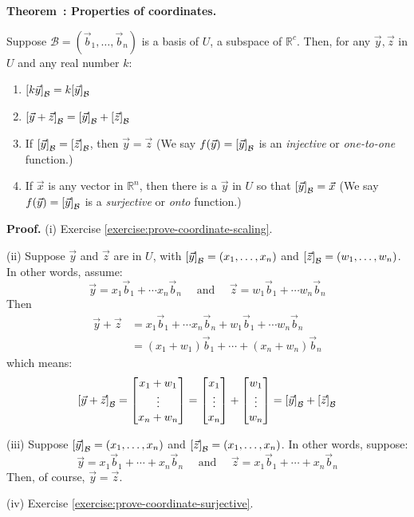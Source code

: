 \documentclass[11pt, letterpaper]{report}
\newenvironment{book}{}{}
\let\originalleft\left
\let\originalright\right
\renewcommand{\left}{\mathopen{}\mathclose\bgroup\originalleft}
\renewcommand{\right}{\aftergroup\egroup\originalright}
\newcounter{exercise}[section]
\newcounter{theorem}[chapter]
\newenvironment{theorem}[1][]{\refstepcounter{theorem}\begin{bbox}\par
    \noindent\textbf{Theorem~\thetheorem: #1}}{\end{bbox}}
\newlength\oldfboxsep%
\newlength\myminiwidth%
\newenvironment{bbox}{%
  \setlength\oldfboxsep\fboxsep
  \setlength{\fboxsep}{.1in}%
  \setlength\myminiwidth\linewidth%
  \addtolength\myminiwidth{-0.2in}%
  \vspace{0.1in}%
  \begin{lrbox}{\bboxbox}\begin{minipage}{\myminiwidth}%
    }{%
    \end{minipage}\end{lrbox}%
  \noindent\fbox{\usebox{\bboxbox}}\vspace{0.1in}\setlength\fboxsep\oldfboxsep%
}
\newcommand{\R}{\mathbb{R}}
\newcommand{\bbbvec}[3]{
  \begin{bmatrix} #1 \\ #2 \\ #3 \end{bmatrix}
}
\begin{document}
\begin{theorem}[Properties of coordinates.] 
\label{theorem:properties-of-coordinates}

Suppose $\mathcal{B} = ( \vec{b}_1, \ldots, \vec{b}_n )$ is a basis of $U$, a subspace of $\R^c$. Then, for any $\vec{y},\vec{z}$ in $U$ and any real number $k$:
\begin{enumerate}[label=(\roman*)]
\item $\left[ k\vec{y} \right]_{\mathcal{B}} = k \left[ \vec{y} \right]_{\mathcal{B}}$
\item $\left[ \vec{y} + \vec{z} \right]_{\mathcal{B}} =  \left[ \vec{y} \right]_{\mathcal{B}}+\left[ \vec{z} \right]_{\mathcal{B}}$
\item If $\left[ \vec{y} \right]_{\mathcal{B}} = \left[ \vec{z} \right]_{\mathcal{B}}$, then $\vec{y}=\vec{z}$ \quad (We say $f(\vec{y}) =\left[ \vec{y} \right]_{\mathcal{B}}$ is an \emph{injective} or \emph{one-to-one} function.)
\item If $\vec{x}$ is any vector in $\R^n$, then there is a $\vec{y}$ in $U$ so that $\left[ \vec{y} \right]_{\mathcal{B}}=\vec{x}$ \quad (We say $f(\vec{y}) =\left[ \vec{y} \right]_{\mathcal{B}}$ is a \emph{surjective} or \emph{onto} function.)
\end{enumerate}
\end{theorem}

\begin{book}
\textbf{Proof.} (i) Exercise \ref{exercise:prove-coordinate-scaling}.

(ii) Suppose $\vec{y}$ and $\vec{z}$ are in $U$, with $\left[ \vec{y} \right]_{\mathcal{B}}= (x_1,\ldots,x_n)$ and $\left[ \vec{z} \right]_{\mathcal{B}}= (w_1,\ldots,w_n)$. In other words, assume: \[\vec{y}=x_1\vec{b}_1 + \cdots x_n\vec{b}_n \quad \text{ and }\quad \vec{z}=w_1\vec{b}_1 + \cdots w_n\vec{b}_n\]
Then
\begin{align*}
\vec{y}+\vec{z} &= x_1\vec{b}_1 + \cdots x_n\vec{b}_n + w_1\vec{b}_1 + \cdots w_n\vec{b}_n \\
&=(x_1+w_1)\vec{b}_1 + \cdots + (x_n+w_n)\vec{b}_n
\end{align*}
which means: \[\left[ \vec{y}+\vec{z} \right]_{\mathcal{B}} = \bbbvec{x_1+w_1}{\vdots}{x_n+w_n} = \bbbvec{x_1}{\vdots}{x_n} + \bbbvec{w_1}{\vdots}{w_n}  = \left[ \vec{y} \right]_{\mathcal{B}}+\left[ \vec{z} \right]_{\mathcal{B}}\]

(iii) Suppose $\left[ \vec{y} \right]_{\mathcal{B}} = (x_1,\ldots,x_n)$ and $\left[ \vec{z} \right]_{\mathcal{B}}  = (x_1,\ldots,x_n)$. In other words, suppose:
\[\vec{y}=x_1\vec{b}_1+\cdots + x_n\vec{b}_n \quad \text{ and } \quad \vec{z}=x_1\vec{b}_1+\cdots + x_n\vec{b}_n\]
Then, of course, $\vec{y}=\vec{z}$.

(iv) Exercise \ref{exercise:prove-coordinate-surjective}. \blacksquare
\end{book}
\end{document}
